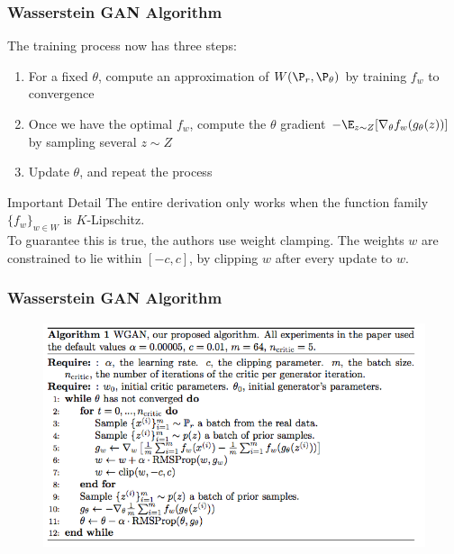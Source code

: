 \documentclass{beamer}
\begin{document}
\begin{frame}
\frametitle{Wasserstein GAN Algorithm}
The training process now has three steps:
\begin{enumerate}
\pause
\item{For a fixed $\theta$, compute an approximation of $W(\P_{r},\P_{\theta})$ by training $f_{w}$ to convergence}
\pause
\item{Once we have the optimal $f_{w}$, compute the $\theta$ gradient $-\E_{z\sim Z}[\nabla_{\theta} f_{w}(g_{\theta}(z))]$ by sampling several $z \sim Z$}
\pause
\item{Update $\theta$, and repeat the process}
\end{enumerate}
\pause
\begin{block}{Important Detail}
The entire derivation only works when the function family $\{f_{w}\}_{w \in W}$ is $K$-Lipschitz.\\
\vspace{0.12in}
\pause
To guarantee this is true, the authors use weight clamping. The weights $w$ are constrained to lie within $[-c,c]$, by clipping $w$ after every update to $w$.\\
\end{block}
\end{frame}

\begin{frame}
\frametitle{Wasserstein GAN Algorithm}
\begin{figure}
\centering
\includegraphics[width=1.07\textwidth]{wgan.png}
\end{figure}
\end{frame}
\end{document}
